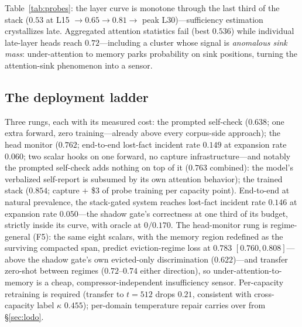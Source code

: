 \documentclass[11pt]{article}
\newcommand{\lostfact}{lost-fact incident rate}
\begin{document}
Table~\ref{tab:probes}: the layer curve is monotone through the last third
of the stack ($0.53$ at L15 $\rightarrow 0.65 \rightarrow 0.81 \rightarrow$
peak L30)---sufficiency estimation crystallizes late. Aggregated attention
statistics fail (best $0.536$) while individual late-layer heads reach
$0.72$---including a cluster whose signal is \emph{anomalous sink mass}:
under-attention to memory parks probability on sink positions, turning the
attention-sink phenomenon into a sensor.

\subsection{The deployment ladder}
\label{sec:ladder}
Three rungs, each with its measured cost: the prompted self-check ($0.638$;
one extra forward, zero training---already above every corpus-side
approach); the head monitor ($0.762$; end-to-end \lostfact{} $0.149$ at
expansion rate $0.060$; two scalar hooks on one forward, no capture
infrastructure---and notably the prompted self-check adds nothing on top of
it ($0.763$ combined): the model's verbalized self-report is subsumed by its
own attention behavior); the trained stack ($0.854$; capture $+$ \$3 of probe
training per capacity point). End-to-end at natural prevalence, the
stack-gated system reaches \lostfact{} $0.146$ at expansion rate
$\mathbf{0.050}$---the shadow gate's correctness at one third of its budget,
strictly inside its curve, with oracle at $0/0.170$. The head-monitor rung
is regime-general (F5): the same eight scalars, with the memory region
redefined as the surviving compacted span, predict eviction-regime loss at
$0.783$ $[0.760, 0.808]$---above the shadow gate's own evicted-only
discrimination ($0.622$)---and transfer zero-shot between regimes
($0.72$--$0.74$ either direction), so under-attention-to-memory is a cheap,
compressor-independent insufficiency sensor. Per-capacity retraining
is required (transfer to $t{=}512$ drops $0.21$, consistent with
cross-capacity label $\kappa$ $0.455$); per-domain temperature repair carries
over from \S\ref{sec:lodo}.
\end{document}
